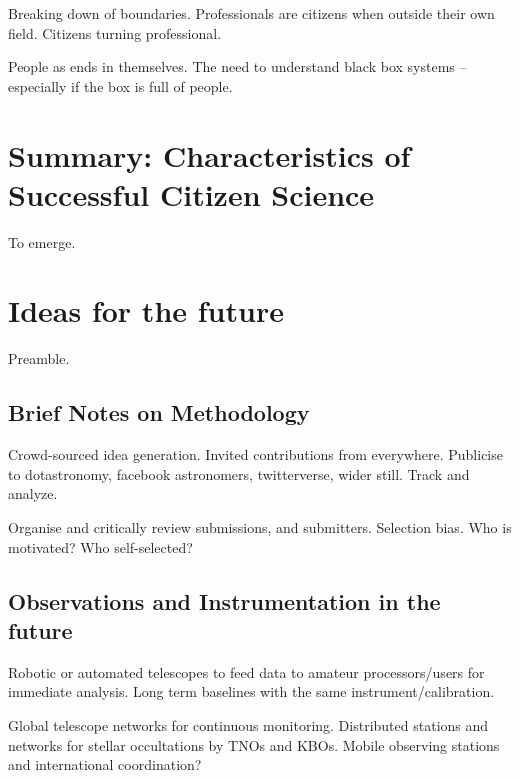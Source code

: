 \documentclass{ar2e}
\begin{document}
Breaking down of boundaries. Professionals are citizens when outside their own
field. Citizens turning professional.

People as ends in themselves. The need to understand black box systems --
especially if the box is full of people. 



\section{Summary: Characteristics of Successful Citizen Science}
\label{sec:summary}

To emerge.



\section{Ideas for the future}
\label{sec:future}

Preamble.


\subsection{Brief Notes on Methodology}
\label{sec:future:method}

Crowd-sourced idea generation.  Invited contributions from everywhere. 
Publicise to dotastronomy, facebook astronomers, twitterverse, wider still.
Track and analyze.

Organise and critically review submissions, and submitters. Selection bias.
Who is motivated? Who self-selected? 


\subsection{Observations and Instrumentation in the future}
\label{sec:future:obs}

Robotic or automated telescopes to feed data to amateur processors/users for
immediate analysis.  Long term baselines with the same 
instrument/calibration.

Global telescope networks for continuous monitoring.
Distributed stations and networks for stellar occultations by TNOs and KBOs. 
Mobile observing stations and international coordination?
\end{document}
